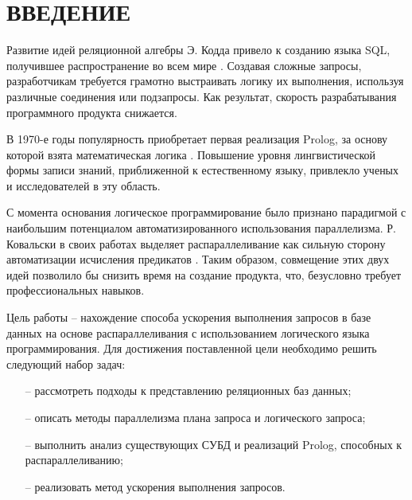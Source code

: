 \chapter*{\hfill{\centering ВВЕДЕНИЕ}\hfill}

Развитие идей реляционной алгебры Э. Кодда привело к созданию языка SQL, получившее распространение во всем мире \cite{sql_history}. Создавая сложные запросы, разработчикам требуется грамотно выстраивать логику их выполнения, используя различные соединения или подзапросы. Как результат, скорость разрабатывания программного продукта снижается.

В 1970-е годы популярность приобретает первая реализация Prolog, за основу которой взята математическая логика \cite{prolog_history}. Повышение уровня лингвистической формы записи знаний, приближенной к естественному языку, привлекло ученых и исследователей в эту область. 

С момента основания логическое программирование было признано парадигмой с наибольшим потенциалом автоматизированного использования параллелизма. Р. Ковальски в своих работах выделяет распараллеливание как сильную сторону автоматизации исчисления предикатов \cite{kowalski}. Таким образом, совмещение этих двух идей позволило бы снизить время на создание продукта, что, безусловно требует профессиональных навыков.

Цель работы -- нахождение способа ускорения выполнения запросов в базе данных на основе распараллеливания с использованием логического языка программирования. Для достижения поставленной цели необходимо решить следующий набор задач:
\begin{itemize}
	\item [--] рассмотреть подходы к представлению реляционных баз данных;
	\item [--] описать методы параллелизма плана запроса и логического запроса;
	\item [--] выполнить анализ существующих СУБД и реализаций Prolog, способных к распараллеливанию;
	\item [--] реализовать метод ускорения выполнения запросов.
\end{itemize}